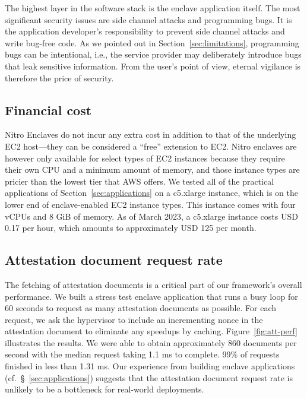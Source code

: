 The highest layer in the software stack is the enclave application itself.  The
most significant security issues are side channel attacks and programming bugs.
It is the application developer's responsibility to prevent side channel attacks
and write bug-free code.  As we pointed out in Section~\ref{sec:limitations},
programming bugs can be intentional, i.e., the service provider may deliberately
introduce bugs that leak sensitive information.  From the user's point of view,
eternal vigilance is therefore the price of security.

\subsection{Financial cost}%
\label{sec:cost}

Nitro Enclaves do not incur any extra cost in addition to that of the underlying
EC2 host---they can be considered a ``free'' extension to EC2.  Nitro enclaves
are however only available for select types of EC2 instances because they
require their own CPU and a minimum amount of memory, and those instance types
are pricier than the lowest tier that AWS offers.  We tested all of the
practical applications of Section~\ref{sec:applications} on a c5.xlarge
instance, which is on the lower end of enclave-enabled EC2 instance types.  This
instance comes with four vCPUs and 8 GiB of memory.  As of March 2023, a
c5.xlarge instance costs USD 0.17 per hour, which amounts to approximately USD
125 per month.

\subsection{Attestation document request rate}%
\label{sec:attestation-performance}

The fetching of attestation documents is a critical part of our framework's
overall performance.  We built a stress test enclave application that runs a
busy loop for 60 seconds to request as many attestation documents as possible.
For each request, we ask the hypervisor to include an incrementing nonce in the
attestation document to eliminate any speedups by caching.
Figure~\ref{fig:att-perf} illustrates the results.  We were able to obtain
approximately 860 documents per second with the median request taking 1.1 ms to
complete.  99\% of requests finished in less than 1.31 ms.  Our experience from
building enclave applications (cf.~\S~\ref{sec:applications}) suggests that the
attestation document request rate is unlikely to be a bottleneck for real-world
deployments.

